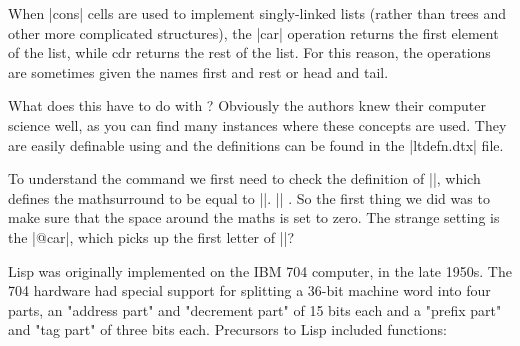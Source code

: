 When |cons| cells are used to implement singly-linked lists (rather than trees and other more complicated structures), the |car| operation returns the first element of the list, while cdr returns the rest of the list. For this reason, the operations are sometimes given the names first and rest or head and tail.

What does this have to do with \latex? Obviously the \latex authors knew their computer science well, as you can find many instances where these concepts are used. They are easily definable using \tex and the definitions can be found in the |ltdefn.dtx| file.






\begin{teX}
\makeatletter
 \def\LaTeXe{%
   \mbox{\m@th%
    \if b\expandafter\@car\f@series\@nil\boldmath\fi
     \LaTeX\kern.15em2$_{\textstyle\varepsilon}$}}
\makeatother
\end{teX}

\scalebox{5}{\LaTeXe}

To understand the command we first need to check the definition of |\m@th|, which defines the mathsurround to be equal to |\z@|. |\def\m@th{\mathsurround\z@}| . So the first thing we did was to make sure that the space around the maths is set to zero. The strange setting is the |@car|, which picks up the first letter of |\boldmath|?

\makeatletter
\def\Latex{%
   \mbox{\m@th%
    \boldmath
     \LaTeX\kern.15em2$_{\textstyle\varepsilon}$}}
 

\makeatother

\scalebox{5}{\Latex}


Lisp was originally implemented on the IBM 704 computer, in the late 1950s. The 704 hardware had special support for splitting a 36-bit machine word into four parts, an "address part" and "decrement part" of 15 bits each and a "prefix part" and "tag part" of three bits each.
Precursors to Lisp included functions:

